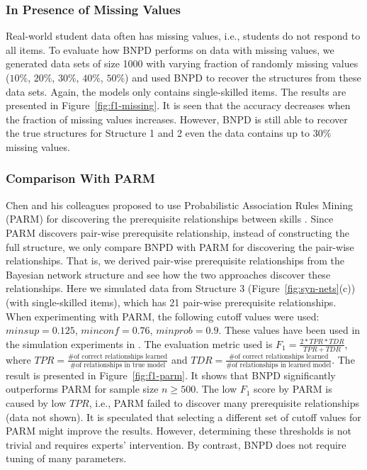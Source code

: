 \documentclass{edm_template}
\begin{document}
{	\subsubsection{In Presence of Missing Values}
	Real-world student data often has missing values, i.e., students do not respond to all items. %
	To evaluate how BNPD performs on data with missing values, we generated data sets of size 1000 with varying fraction of randomly missing values ($10\%$, $20\%$, $30\%$, $40\%$, $50\%$) and used BNPD to recover the structures from these data sets. Again, the models only contains single-skilled items.  
	The results are presented in Figure~\ref{fig:f1-missing}.
	It is seen that the accuracy decreases when the fraction of missing values increases. 
	However, BNPD is still able to recover the true structures for Structure 1 and 2 even the data contains up to $30\%$ missing values. 
	
	\subsubsection{Comparison With PARM}
	Chen and his colleagues proposed to use Probabilistic Association Rules Mining (PARM) for discovering the prerequisite relationships between skills \cite{chen2015discovering}.
	Since PARM discovers pair-wise prerequisite relationship, instead of constructing the full structure,
	we only compare BNPD with PARM for discovering the pair-wise relationships.
	That is, we derived pair-wise prerequisite relationships from the Bayesian network structure and see how the two approaches discover these relationships.
	Here we simulated data from Structure 3 (Figure~\ref{fig:syn-nets}(c)) (with single-skilled items), which has 21 pair-wise prerequisite relationships.
	When experimenting with PARM, the following cutoff values were used: $ minsup=0.125$, $minconf=0.76$, $minprob=0.9$. 
	These values have been used in the simulation experiments in \cite{chen2015discovering}.
	The evaluation metric used is $F_1=\frac{2*TPR*TDR}{TPR+TDR}$, where $TPR=\frac{\text{\# of correct relationships learned}}{\text{\# of relationships in true model}}$
	and $TDR=\frac{\text{\# of correct relationships learned}}{\text{\# of relationships in learned model}}$.
	The result is presented in Figure~\ref{fig:f1-parm}. It shows that BNPD significantly outperforms PARM for sample size $n\ge 500$.
	The low $F_1$ score by PARM is caused by low $TPR$, i.e., PARM failed to discover many prerequisite relationships (data not shown).
	It is speculated that selecting a different set of cutoff values for PARM might improve the results.
	However, determining these thresholds is not trivial and requires experts' intervention. By contrast, BNPD does not require tuning of many parameters.  
	
}
\end{document}
